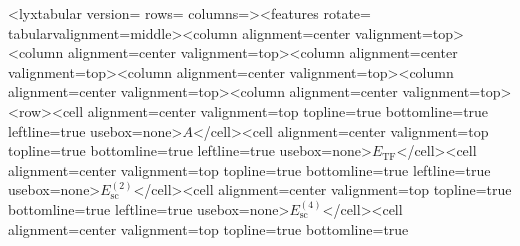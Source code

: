 \begin{table}[H]
\caption{\label{tab:13.1}表 13.1：与图 13.1 相同参数的球形 Woods-Saxon 势阱中的平滑结合能量（单位均为
MeV）。第一列为核子数$A=2N=2Z$。第二、三、四列分别给出$E_{\mathrm{TF}}$、$E^{(2)}_{\mathrm{sc}}$和$E^{(4)}_{\mathrm{sc}}$，分别对应式
(13.42) 中 TF 项、$\mathcal{O}(\hbar^{2})$项及$\mathcal{O}(\hbar^{4})$项的贡献。第五列给出总半经典能量$E_{\mathrm{sc}}$，最后一列给出
Strutinsky 平滑能量（引自 \cite{Je76}）。}

\centering{}<lyxtabular version=\textquotedbl{} rows=\textquotedbl{}
columns=\textquotedbl ><features rotate=\textquotedbl{}
tabularvalignment=\textquotedbl middle\textquotedbl ><column alignment=\textquotedbl center\textquotedbl{}
valignment=\textquotedbl top\textquotedbl ><column alignment=\textquotedbl center\textquotedbl{}
valignment=\textquotedbl top\textquotedbl ><column alignment=\textquotedbl center\textquotedbl{}
valignment=\textquotedbl top\textquotedbl ><column alignment=\textquotedbl center\textquotedbl{}
valignment=\textquotedbl top\textquotedbl ><column alignment=\textquotedbl center\textquotedbl{}
valignment=\textquotedbl top\textquotedbl ><column alignment=\textquotedbl center\textquotedbl{}
valignment=\textquotedbl top\textquotedbl ><row><cell alignment=\textquotedbl center\textquotedbl{}
valignment=\textquotedbl top\textquotedbl{} topline=\textquotedbl true\textquotedbl{}
bottomline=\textquotedbl true\textquotedbl{} leftline=\textquotedbl true\textquotedbl{}
usebox=\textquotedbl none\textquotedbl >$A$</cell><cell alignment=\textquotedbl center\textquotedbl{}
valignment=\textquotedbl top\textquotedbl{} topline=\textquotedbl true\textquotedbl{}
bottomline=\textquotedbl true\textquotedbl{} leftline=\textquotedbl true\textquotedbl{}
usebox=\textquotedbl none\textquotedbl >$E_{\mathrm{TF}}$</cell><cell
alignment=\textquotedbl center\textquotedbl{} valignment=\textquotedbl top\textquotedbl{}
topline=\textquotedbl true\textquotedbl{} bottomline=\textquotedbl true\textquotedbl{}
leftline=\textquotedbl true\textquotedbl{} usebox=\textquotedbl none\textquotedbl >$E^{(2)}_{\mathrm{sc}}$</cell><cell
alignment=\textquotedbl center\textquotedbl{} valignment=\textquotedbl top\textquotedbl{}
topline=\textquotedbl true\textquotedbl{} bottomline=\textquotedbl true\textquotedbl{}
leftline=\textquotedbl true\textquotedbl{} usebox=\textquotedbl none\textquotedbl >$E^{(4)}_{\mathrm{sc}}$</cell><cell
alignment=\textquotedbl center\textquotedbl{} valignment=\textquotedbl top\textquotedbl{}
topline=\textquotedbl true\textquotedbl{} bottomline=\textquotedbl true\textquotedbl{}

\end{table}
